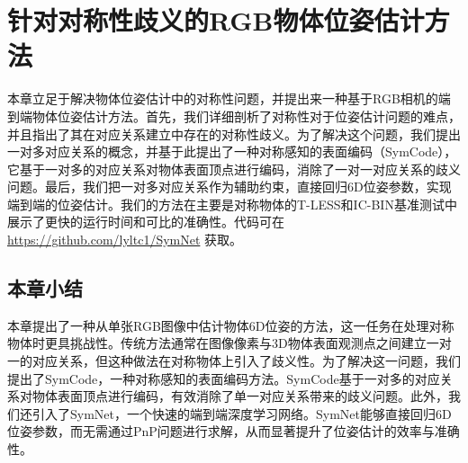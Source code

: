 \chapter{针对对称性歧义的RGB物体位姿估计方法}

本章立足于解决物体位姿估计中的对称性问题，并提出来一种基于RGB相机的端到端物体位姿估计方法。首先，我们详细剖析了对称性对于位姿估计问题的难点，并且指出了其在对应关系建立中存在的对称性歧义。为了解决这个问题，我们提出一对多对应关系的概念，并基于此提出了一种对称感知的表面编码（SymCode），它基于一对多的对应关系对物体表面顶点进行编码，消除了一对一对应关系的歧义问题。最后，我们把一对多对应关系作为辅助约束，直接回归6D位姿参数，实现端到端的位姿估计。我们的方法在主要是对称物体的T-LESS和IC-BIN基准测试中展示了更快的运行时间和可比的准确性。代码可在 \href{https://github.com/lyltc1/SymNet}{https://github.com/lyltc1/SymNet} 获取。


\section{本章小结}
本章提出了一种从单张RGB图像中估计物体6D位姿的方法，这一任务在处理对称物体时更具挑战性。传统方法通常在图像像素与3D物体表面观测点之间建立一对一的对应关系，但这种做法在对称物体上引入了歧义性。为了解决这一问题，我们提出了SymCode，一种对称感知的表面编码方法。SymCode基于一对多的对应关系对物体表面顶点进行编码，有效消除了单一对应关系带来的歧义问题。此外，我们还引入了SymNet，一个快速的端到端深度学习网络。SymNet能够直接回归6D位姿参数，而无需通过PnP问题进行求解，从而显著提升了位姿估计的效率与准确性。